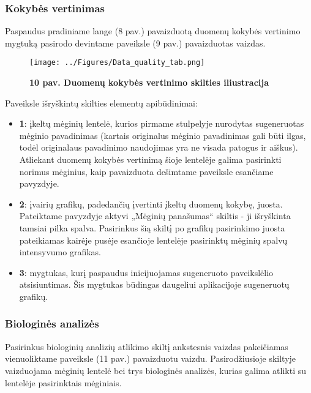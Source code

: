 \documentclass[12pt]{article}
\begin{document}
\newpage

\subsubsection*{Kokybės vertinimas}
Paspaudus pradiniame lange (8 pav.) pavaizduotą duomenų kokybės vertinimo
mygtuką pasirodo devintame paveiksle (9 pav.) pavaizduotas vaizdas.

\begin{figure}[ht]
    \begin{center}
        \captionsetup{justification=centering}
        \texttt{[image: ../Figures/Data\_quality\_tab.png]}
        \vspace{-1.5\baselineskip}
        \caption*{\small\textbf{10 pav. Duomenų kokybės vertinimo skilties
                                iliustracija}}
    \end{center}
    \label{fig:data_quality_tab}
\end{figure}

Paveiksle išryškintų skilties elementų apibūdinimai:
\begin{itemize}
    \item \textbf{\large{1}}: įkeltų mėginių lentelė, kurios pirmame stulpelyje
        nurodytas sugeneruotas mėginio pavadinimas (kartais originalus mėginio
        pavadinimas gali būti ilgas, todėl originalaus pavadinimo naudojimas
        yra ne visada patogus ir aiškus). Atliekant duomenų kokybės vertinimą
        šioje lentelėje galima pasirinkti norimus mėginius, kaip pavaizduota
        dešimtame paveiksle esančiame pavyzdyje.
    \item \textbf{\large{2}}: įvairių grafikų, padedančių įvertinti įkeltų
        duomenų kokybę, juosta. Pateiktame pavyzdyje aktyvi „Mėginių
        panašumas“ skiltis - ji išryškinta tamsiai pilka spalva. Pasirinkus
        šią skiltį po grafikų pasirinkimo juosta pateikiamas kairėje pusėje
        esančioje lentelėje pasirinktų mėginių spalvų intensyvumo grafikas.
    \item \textbf{\large{3}}: mygtukas, kurį paspaudus inicijuojamas sugeneruoto
        paveikslėlio atsisiuntimas. Šis mygtukas būdingas daugeliui aplikacijoje
        sugeneruotų grafikų.
\end{itemize}

\newpage

\subsubsection*{Biologinės analizės}
Pasirinkus biologinių analizių atlikimo skiltį ankstesnis vaizdas pakeičiamas
vienuoliktame paveiksle (11 pav.) pavaizduotu vaizdu. Pasirodžiusioje skiltyje
vaizduojama mėginių lentelė bei trys biologinės analizės, kurias galima atlikti
su lentelėje pasirinktais mėginiais.
\end{document}
